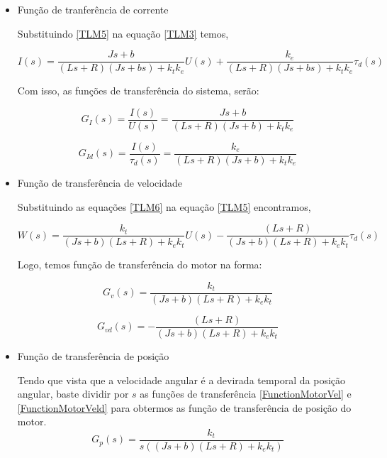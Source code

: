\documentclass[]{politex}
\begin{document}
\begin{itemize}

\item Função de tranferência de corrente

    Substituindo \eqref{TLM5} na equação \eqref{TLM3} temos,

    \begin{equation}
    \label{TLM6}
    I(s) = \frac{J s + b}{(L s + R) ( J s + b s) +  k_{t} k_{e}} U(s) + \frac{k_{e}}{(L s + R) ( J s + b s) +  k_{t} k_{e}} \tau_{d}(s)
    \end{equation}

    Com isso, as funções de transferência do sistema, serão:

    \begin{equation}
    \label{functionTransferMotor}
        G_{I}(s) = \frac{I(s)}{U(s)} = \frac{J s+b}{(L s + R) (J s+b)+k_{t}k_{e}}
    \end{equation}

    \begin{equation}
    \label{functionTransferDist}
        G_{Id}(s) = \frac{I(s)}{\tau_{d}(s)} = \frac{k_{e}}{(L s + R)( J s+b)+k_{t}k_{e}}
    \end{equation}

\item Função de transferência de velocidade

Substituindo as equações \eqref{TLM6} na equação \eqref{TLM5} encontramos,

    \begin{equation}
     W(s) = \frac{k_{t}}{(J s + b)(L s + R) + k_{e} k_{t}} U(s) - \frac{(L s + R)}{(J s + b)(L s + R) + k_{e} k_{t}} \tau_d(s)
    \end{equation}

    Logo, temos função de transferência do motor na forma:
    
    \begin{equation}
    \label{FunctionMotorVel}
     G_v(s) = \frac{k_{t}}{(J s + b)(L s + R) + k_{e} k_{t}} 
    \end{equation}
    
    \begin{equation}
    \label{FunctionMotorVeld}
     G_{vd}(s) = - \frac{(L s + R)}{(J s + b)(L s + R) + k_{e} k_{t}}
    \end{equation}
    
\item Função de transferência de posição

Tendo que vista que a velocidade angular é a devirada temporal da posição angular, baste dividir por $s$ as funções de transferência \eqref{FunctionMotorVel} e \eqref{FunctionMotorVeld} para obtermos as função de transferência de posição do motor.
    \begin{equation}
    \label{FunctionMotor}
     G_p(s) = \frac{k_{t}}{s((J s + b)(L s + R) + k_{e} k_{t})}
    \end{equation}
    

\end{itemize}
\end{document}
